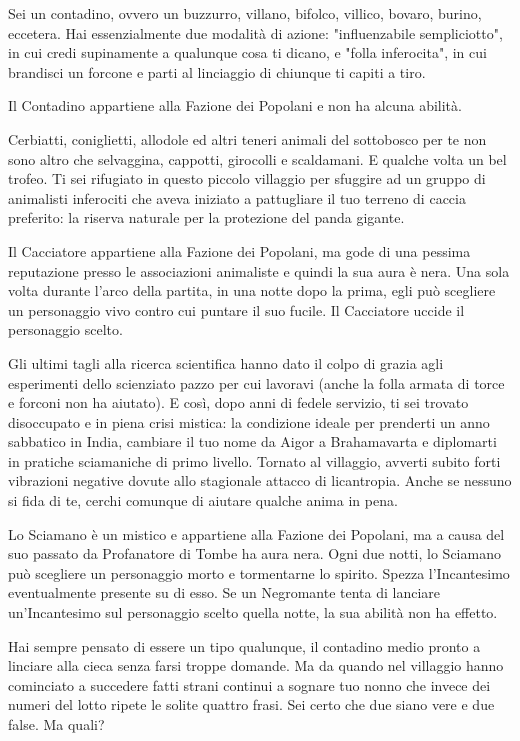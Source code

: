 {%
Sei un contadino, ovvero un buzzurro, villano, bifolco, villico, bovaro, burino, eccetera. Hai essenzialmente due modalità di azione: "influenzabile sempliciotto", in cui credi supinamente a qualunque cosa ti dicano, e "folla inferocita", in cui brandisci un forcone e parti al linciaggio di chiunque ti capiti a tiro.

Il Contadino appartiene alla Fazione dei Popolani e non ha alcuna abilità.
{%

{%
Cerbiatti, coniglietti, allodole ed altri teneri animali del sottobosco per te non sono altro che selvaggina, cappotti, girocolli e scaldamani. E qualche volta un bel trofeo. Ti sei rifugiato in questo piccolo villaggio per sfuggire ad un gruppo di animalisti inferociti che aveva iniziato a pattugliare il tuo terreno di caccia preferito: la riserva naturale per la protezione del panda gigante.

Il Cacciatore appartiene alla Fazione dei Popolani, ma gode di una pessima reputazione presso le associazioni animaliste e quindi la sua aura è nera. Una sola volta durante l'arco della partita, in una notte dopo la prima, egli può scegliere un personaggio vivo contro cui puntare il suo fucile. Il Cacciatore uccide il personaggio scelto.
{%

{%
Gli ultimi tagli alla ricerca scientifica hanno dato il colpo di grazia agli esperimenti dello scienziato pazzo per cui lavoravi (anche la folla armata di torce e forconi non ha aiutato). E così, dopo anni di fedele servizio, ti sei trovato disoccupato e in piena crisi mistica: la condizione ideale per prenderti un anno sabbatico in India, cambiare il tuo nome da Aigor a Brahamavarta e diplomarti in pratiche sciamaniche di primo livello. Tornato al villaggio, avverti subito forti vibrazioni negative dovute allo stagionale attacco di licantropia. Anche se nessuno si fida di te, cerchi comunque di aiutare qualche anima in pena.

Lo Sciamano è un mistico e appartiene alla Fazione dei Popolani, ma a causa del suo passato da Profanatore di Tombe ha aura nera. Ogni due notti, lo Sciamano può scegliere un personaggio morto e tormentarne lo spirito. Spezza l'Incantesimo eventualmente presente su di esso. Se un Negromante tenta di lanciare un'Incantesimo sul personaggio scelto quella notte, la sua abilità non ha effetto.
{%


{%
Hai sempre pensato di essere un tipo qualunque, il contadino medio pronto a linciare alla cieca senza farsi troppe domande. Ma da quando nel villaggio hanno cominciato a succedere fatti strani continui a sognare tuo nonno che invece dei numeri del lotto ripete le solite quattro frasi. Sei certo che due siano vere e due false. Ma quali?

}}}}}}}
